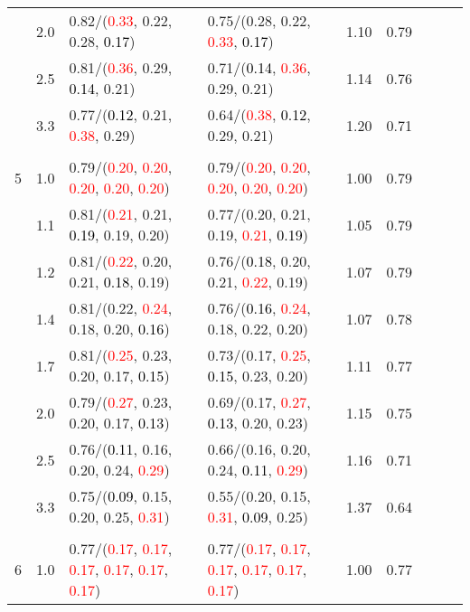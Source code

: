\documentclass[10pt,a4paper]{report}
\begin{document}
\begin{table}[!htbp]
\begin{center}
{\begin{tabular}{ccllccccc}
			&2.0&0.82/(\textcolor{red}{0.33}, 0.22, 0.28, \textcolor{black}{0.17})&0.75/(0.28, 0.22, \textcolor{red}{0.33}, \textcolor{black}{0.17})&1.10&0.79\\
			&2.5&0.81/(\textcolor{red}{0.36}, 0.29, \textcolor{black}{0.14}, 0.21)&0.71/(\textcolor{black}{0.14}, \textcolor{red}{0.36}, 0.29, 0.21)&1.14&0.76\\
			&3.3&0.77/(\textcolor{black}{0.12}, 0.21, \textcolor{red}{0.38}, 0.29)&0.64/(\textcolor{red}{0.38}, \textcolor{black}{0.12}, 0.29, 0.21)&1.20&0.71\\
			&&&&\\
			5			&1.0&0.79/(\textcolor{red}{0.20}, \textcolor{red}{0.20}, \textcolor{red}{0.20}, \textcolor{red}{0.20}, \textcolor{red}{0.20})&0.79/(\textcolor{red}{0.20}, \textcolor{red}{0.20}, \textcolor{red}{0.20}, \textcolor{red}{0.20}, \textcolor{red}{0.20})&1.00&0.79\\
			&1.1&0.81/(\textcolor{red}{0.21}, 0.21, \textcolor{black}{0.19}, 0.19, 0.20)&0.77/(0.20, 0.21, 0.19, \textcolor{red}{0.21}, \textcolor{black}{0.19})&1.05&0.79\\
			&1.2&0.81/(\textcolor{red}{0.22}, 0.20, 0.21, \textcolor{black}{0.18}, 0.19)&0.76/(\textcolor{black}{0.18}, 0.20, 0.21, \textcolor{red}{0.22}, 0.19)&1.07&0.79\\
			&1.4&0.81/(0.22, \textcolor{red}{0.24}, 0.18, 0.20, \textcolor{black}{0.16})&0.76/(\textcolor{black}{0.16}, \textcolor{red}{0.24}, 0.18, 0.22, 0.20)&1.07&0.78\\
			&1.7&0.81/(\textcolor{red}{0.25}, 0.23, 0.20, 0.17, \textcolor{black}{0.15})&0.73/(0.17, \textcolor{red}{0.25}, \textcolor{black}{0.15}, 0.23, 0.20)&1.11&0.77\\
			&2.0&0.79/(\textcolor{red}{0.27}, 0.23, 0.20, 0.17, \textcolor{black}{0.13})&0.69/(0.17, \textcolor{red}{0.27}, \textcolor{black}{0.13}, 0.20, 0.23)&1.15&0.75\\
			&2.5&0.76/(\textcolor{black}{0.11}, 0.16, 0.20, 0.24, \textcolor{red}{0.29})&0.66/(0.16, 0.20, 0.24, \textcolor{black}{0.11}, \textcolor{red}{0.29})&1.16&0.71\\
			&3.3&0.75/(\textcolor{black}{0.09}, 0.15, 0.20, 0.25, \textcolor{red}{0.31})&0.55/(0.20, 0.15, \textcolor{red}{0.31}, \textcolor{black}{0.09}, 0.25)&1.37&0.64\\
			&&&&\\
			6			&1.0&0.77/(\textcolor{red}{0.17}, \textcolor{red}{0.17}, \textcolor{red}{0.17}, \textcolor{red}{0.17}, \textcolor{red}{0.17}, \textcolor{red}{0.17})&0.77/(\textcolor{red}{0.17}, \textcolor{red}{0.17}, \textcolor{red}{0.17}, \textcolor{red}{0.17}, \textcolor{red}{0.17}, \textcolor{red}{0.17})&1.00&0.77\\

\end{tabular}}
\end{center}
\end{table}
\end{document}
